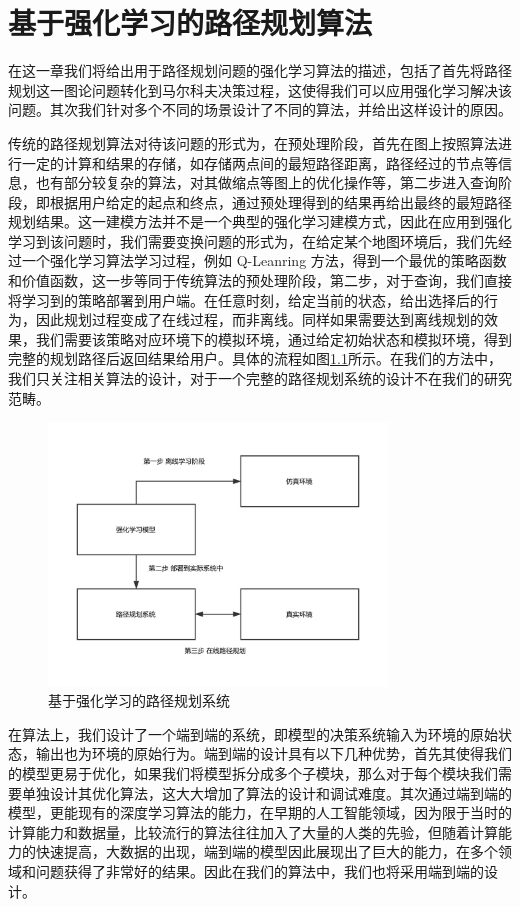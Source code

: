 \documentclass{standalone}
\begin{document}
	
\chapter{基于强化学习的路径规划算法}
在这一章我们将给出用于路径规划问题的强化学习算法的描述，包括了首先将路径规划这一图论问题转化到马尔科夫决策过程，这使得我们可以应用强化学习解决该问题。其次我们针对多个不同的场景设计了不同的算法，并给出这样设计的原因。\par
传统的路径规划算法对待该问题的形式为，在预处理阶段，首先在图上按照算法进行一定的计算和结果的存储，如存储两点间的最短路径距离，路径经过的节点等信息，也有部分较复杂的算法，对其做缩点等图上的优化操作等，第二步进入查询阶段，即根据用户给定的起点和终点，通过预处理得到的结果再给出最终的最短路径规划结果。这一建模方法并不是一个典型的强化学习建模方式，因此在应用到强化学习到该问题时，我们需要变换问题的形式为，在给定某个地图环境后，我们先经过一个强化学习算法学习过程，例如 Q-Leanring 方法，得到一个最优的策略函数和价值函数，这一步等同于传统算法的预处理阶段，第二步，对于查询，我们直接将学习到的策略部署到用户端。在任意时刻，给定当前的状态，给出选择后的行为，因此规划过程变成了在线过程，而非离线。同样如果需要达到离线规划的效果，我们需要该策略对应环境下的模拟环境，通过给定初始状态和模拟环境，得到完整的规划路径后返回结果给用户。具体的流程如图\ref{fig:system}所示。在我们的方法中，我们只关注相关算法的设计，对于一个完整的路径规划系统的设计不在我们的研究范畴。\par
\begin{figure}[H]
    \centering
    \includegraphics[width=9.0cm]{pic/sysmte.pdf}
    \caption{基于强化学习的路径规划系统}
    \label{fig:system}
\end{figure}
在算法上，我们设计了一个端到端的系统，即模型的决策系统输入为环境的原始状态，输出也为环境的原始行为。端到端的设计具有以下几种优势，首先其使得我们的模型更易于优化，如果我们将模型拆分成多个子模块，那么对于每个模块我们需要单独设计其优化算法，这大大增加了算法的设计和调试难度。其次通过端到端的模型，更能现有的深度学习算法的能力，在早期的人工智能领域，因为限于当时的计算能力和数据量，比较流行的算法往往加入了大量的人类的先验，但随着计算能力的快速提高，大数据的出现，端到端的模型因此展现出了巨大的能力，在多个领域和问题获得了非常好的结果。因此在我们的算法中，我们也将采用端到端的设计。\par
\end{document}
